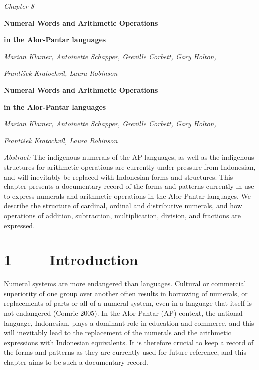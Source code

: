 \clearpage\setcounter{page}{1}\pagestyle{Standard}
{\centering
\textit{Chapter 8}
\par}

{\centering
\textbf{Numeral Words and Arithmetic Operations }
\par}

{\centering
\textbf{in the Alor-Pantar languages }
\par}

{\centering
\emph{Marian Klamer, Antoinette Schapper, Greville Corbett, Gary Holton, }
\par}

{\centering
\emph{Franti}\emph{\v{s}ek}\emph{ Kratochv\'il, Laura Robinson}
\par}

\setcounter{tocdepth}{3}
\renewcommand\contentsname{}
\tableofcontents
{}

{\centering
\textbf{Numeral Words and Arithmetic Operations }
\par}

{\centering
\textbf{in the Alor-Pantar languages }
\par}

{\centering
\emph{Marian Klamer, Antoinette Schapper, Greville Corbett, Gary Holton, }
\par}

{\centering
\emph{Franti}\emph{\v{s}ek}\emph{ Kratochv\'il, Laura Robinson}
\par}

\emph{\textup{Abstract: }}The indigenous numerals of the AP languages, as well as the indigenous structures for arithmetic operations are currently under pressure from Indonesian, and will inevitably be replaced with Indonesian forms and structures. This chapter presents a documentary record of the forms and patterns currently in use to express numerals and arithmetic operations in the Alor-Pantar languages. We describe the structure of cardinal, ordinal and distributive numerals, and how operations of addition, subtraction, multiplication, division, and fractions are expressed.

\section[1 \ \ \ \ Introduction]{1 \ \ \ \ Introduction}
\hypertarget{RefHeading105228871885726}{}\hypertarget{Toc376958929}{}Numeral systems are more endangered than languages. Cultural or commercial superiority of one group over another often results in borrowing of numerals, or replacements of parts or all of a numeral system, even in a language that itself is not endangered (Comrie 2005). In the Alor-Pantar (AP) context, the national language, Indonesian, plays a dominant role in education and commerce, and this will inevitably lead to the replacement of the numerals and the arithmetic expressions with Indonesian equivalents. It is therefore crucial to keep a record of the forms and patterns as they are currently used for future reference, and this chapter aims to be such a documentary record. 


